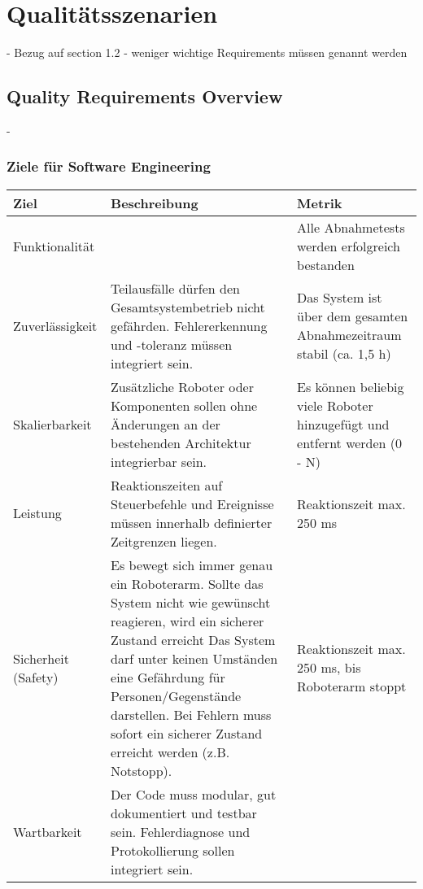 \chapter{Qualitätsszenarien}
- Bezug auf section 1.2 
- weniger wichtige Requirements müssen genannt werden

\section{Quality Requirements Overview}
- 


\subsection{Ziele für Software Engineering}
\begin{table}[h!]
	\centering
	\begin{tabular}{p{4cm}|p{5cm}|p{5cm}|}
		\hline
		\textbf{Ziel} & \textbf{Beschreibung} & \textbf{Metrik} \\
		\hline
		Funktionalität &  
		& Alle Abnahmetests werden erfolgreich bestanden
		\\
		\hline
		Zuverlässigkeit & 
		Teilausfälle dürfen den Gesamtsystembetrieb nicht gefährden. Fehlererkennung und -toleranz müssen integriert sein.
		& Das System ist über dem gesamten Abnahmezeitraum stabil (ca. 1,5 h)
		\\
		\hline
		Skalierbarkeit & 
		Zusätzliche Roboter oder Komponenten sollen ohne Änderungen an der bestehenden Architektur integrierbar sein. 
		& Es können beliebig viele Roboter hinzugefügt und entfernt werden (0 - N)
		\\
		\hline
		Leistung & 
		Reaktionszeiten auf Steuerbefehle und Ereignisse müssen innerhalb definierter Zeitgrenzen liegen. 
		& Reaktionszeit max. 250 ms
		\\
		\hline
		Sicherheit (Safety) & 
		Es bewegt sich immer genau ein Roboterarm. Sollte das System nicht wie gewünscht reagieren, wird ein sicherer Zustand erreicht
		Das System darf unter keinen Umständen eine Gefährdung für Personen/Gegenstände darstellen. Bei Fehlern muss sofort ein sicherer Zustand erreicht werden (z.B. Notstopp). 
		& Reaktionszeit max. 250 ms, bis Roboterarm stoppt
		\\
		\hline
		Wartbarkeit & 
		Der Code muss modular, gut dokumentiert und testbar sein. Fehlerdiagnose und Protokollierung sollen integriert sein. 
		& 
		\\

\end{tabular}
\end{table}
